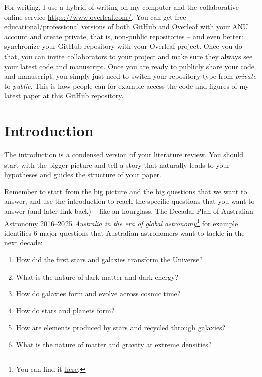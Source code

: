 \documentclass[twocolumn,apj,numberedappendix,appendixfloats]{openjournal}
\begin{document}
For writing, I use a hybrid of writing on my computer and the collaborative online service \url{https://www.overleaf.com/}. You can get free educational/professional versions of both GitHub and Overleaf with your ANU account and create private, that is, non-public repositories -- and even better: synchronize your GitHub repository with your Overleaf project. Once you do that, you can invite collaborators to your project and make sure they always see your latest code and manuscript. Once you are ready to publicly share your code and manuscript, you simply just need to switch your repository type from \textit{private} to \textit{public}. This is how people can for example access the code and figures of my latest paper \citep{Buder2024} at \href{https://github.com/svenbuder/Accretion_Clues_ObsSim}{this} GitHub repository.

\clearpage
\section{Introduction}
\label{sec:introduction}

The introduction is a condensed version of your literature review. You should start with the bigger picture and tell a story that naturally leads to your hypotheses and guides the structure of your paper.

Remember to start from the big picture and the big questions that we want to answer, and use the introduction to reach the specific questions that you want to answer (and later link back) -- like an hourglass. The Decadal Plan of Australian Astronomy 2016--2025 \textit{Australia in the era of global astronomy}\footnote{You can find it \href{https://www.science.org.au/supporting-science/science-sector-analysis/reports-and-publications/decadal-plan-australian-astronomy-2016-25}{here}.} for example identifies 6 major questions that Australian astronomers want to tackle in the next decade: 
\begin{enumerate}
    \item How did the first stars and galaxies transform the Universe?
    \item What is the nature of dark matter and dark energy?
    \item How do galaxies form and evolve across cosmic time?
    \item How do stars and planets form?
    \item How are elements produced by stars and recycled through galaxies?
    \item What is the nature of matter and gravity at extreme densities?
\end{enumerate}
\end{document}
